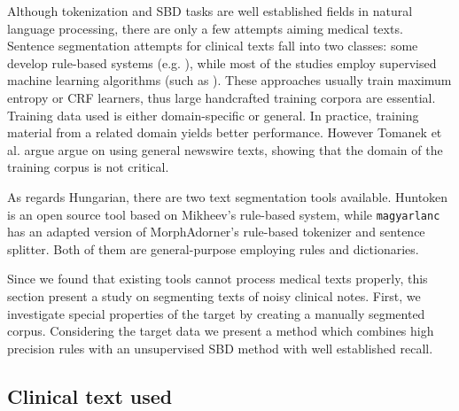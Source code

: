 Although tokenization and SBD tasks are well established fields in natural language processing, there are only a few attempts aiming medical texts. 
Sentence segmentation attempts for clinical texts fall into two classes: some develop rule-based systems (e.g. \cite{XuSDJWD10}), while most of the studies employ supervised machine learning algorithms (such as \cite{apostolova2009automatic,cho2002text,Savova2010,taira2001automatic,tomanek2007sentence}).
These approaches usually train maximum entropy or CRF learners, thus large handcrafted training corpora are essential. Training data used is either domain-specific or general. 
In practice, training material from a related domain yields better performance. However Tomanek et al. argue \cite{tomanek2006reappraisal} argue on using general newswire texts,
showing that the domain of the training corpus is not critical.

As regards Hungarian, there are two text segmentation tools available. Huntoken \cite{halacsy2004creating} is an open source tool based on Mikheev’s rule-based system, while \texttt{magyarlanc} \cite{zsibrata2013magyarlanc} has an adapted version of MorphAdorner’s rule-based tokenizer \cite{kumar2009monk} and sentence splitter. Both of them are general-purpose employing rules and dictionaries.


Since we found that existing tools cannot process medical texts properly, this section present a study on segmenting texts of noisy clinical notes. First, we investigate special properties of the target by creating a manually segmented corpus. Considering the target data we present a method which combines high precision rules with an unsupervised SBD method with well established recall.

\subsection{Clinical text used}
\label{sec:clin_corpus}

